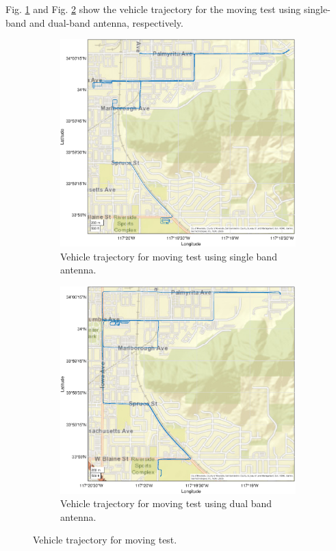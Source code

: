 \documentclass[letterpaper, 10 pt,onecolumn]{article}
\begin{document}
	Fig. \ref{fig:trj_mt1} and Fig. \ref{fig:trj_mt2} show the vehicle trajectory for the moving test using single-band and dual-band antenna, respectively.
	\begin{figure}[H]
		\centering
		\begin{subfigure}{.5\textwidth}
			\includegraphics[width=\linewidth]{figures/trajectory_single.eps}
			\caption{Vehicle trajectory for moving test using single band antenna.}
			\label{fig:trj_mt1}
		\end{subfigure}%
		\begin{subfigure}{.5\textwidth}
			\includegraphics[width=\linewidth]{figures/trajectory_dual.eps}
			\caption{Vehicle trajectory for moving test using dual band antenna.}
			\label{fig:trj_mt2}
		\end{subfigure}
		\caption[short]{Vehicle trajectory for moving test.}
		\label{fig:trj}
	\end{figure}
	
\end{document}
